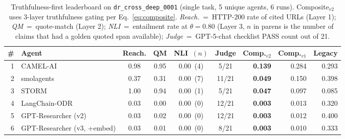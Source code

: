 \begin{table}[ht]
\centering
\small
\caption{Truthfulness-first leaderboard on \texttt{dr\_cross\_deep\_0001} (single task, 5 unique agents, 6 runs). Composite$_{v2}$ uses 3-layer truthfulness gating per Eq.~\ref{eq:composite}. \emph{Reach.}~=~HTTP-200 rate of cited URLs (Layer 1); \emph{QM}~=~quote-match (Layer 2); \emph{NLI}~=~entailment rate at $\theta=0.80$ (Layer 3, $n$ in parens is the number of claims that had a golden quoted span available); \emph{Judge}~=~GPT-5-chat checklist PASS count out of 21.}
\label{tab:leaderboard}
\begin{tabular}{rlccccrrr}
\toprule
\# & Agent & Reach. & QM & NLI~$(n)$ & Judge & Comp.$_{v2}$ & Comp.$_{v1}$ & Legacy \\
\midrule
1 & CAMEL-AI & 0.98 & 0.95 & 0.00~(4) & 5/21 & \textbf{0.139} & 0.284 & 0.293 \\
2 & smolagents & 0.37 & 0.31 & 0.00~(7) & 11/21 & \textbf{0.049} & 0.150 & 0.398 \\
3 & STORM & 1.00 & 0.94 & 0.00~(1) & 5/21 & \textbf{0.047} & 0.097 & 0.085 \\
4 & LangChain-ODR & 0.03 & 0.00 & 0.00~(0) & 12/21 & \textbf{0.003} & 0.013 & 0.320 \\
5 & GPT-Researcher (v2) & 0.03 & 0.02 & 0.00~(0) & 12/21 & \textbf{0.003} & 0.012 & 0.400 \\
6 & GPT-Researcher (v3, +embed) & 0.03 & 0.01 & 0.00~(0) & 8/21 & \textbf{0.003} & 0.010 & 0.333 \\
\bottomrule
\end{tabular}
\end{table}